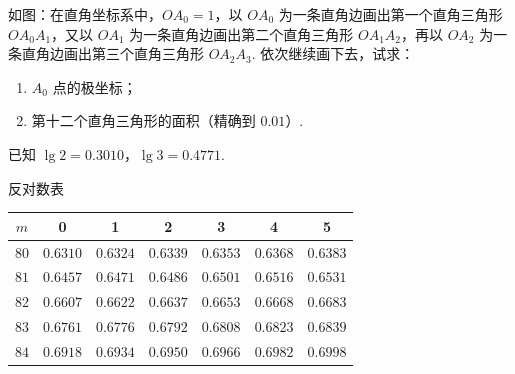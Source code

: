 \begin{problem}
如图：在直角坐标系中，\(OA_0=1\)，以 \(OA_0\) 为一条直角边画出第一个直角三角形 \(OA_0A_1\)，又以 \(OA_1\) 为一条直角边画出第二个直角三角形 \(OA_1A_2\)，再以 \(OA_2\) 为一条直角边画出第三个直角三角形 \(OA_2A_3\). 依次继续画下去，试求：

\begin{enumerate}
    \item \(A_0\) 点的极坐标；
    \item 第十二个直角三角形的面积（精确到 \(0.01\)）.
\end{enumerate}

已知 \(\lg 2=0.3010\)，\(\lg 3=0.4771\).

\begin{center}
反对数表

\begin{tabular}{c|cccccc}
\hline
\(m\) & 0 & 1 & 2 & 3 & 4 & 5 \\
\hline
\(80\) & \(0.6310\) & \(0.6324\) & \(0.6339\) & \(0.6353\) & \(0.6368\) & \(0.6383\) \\
\(81\) & \(0.6457\) & \(0.6471\) & \(0.6486\) & \(0.6501\) & \(0.6516\) & \(0.6531\) \\
\(82\) & \(0.6607\) & \(0.6622\) & \(0.6637\) & \(0.6653\) & \(0.6668\) & \(0.6683\) \\
\(83\) & \(0.6761\) & \(0.6776\) & \(0.6792\) & \(0.6808\) & \(0.6823\) & \(0.6839\) \\
\(84\) & \(0.6918\) & \(0.6934\) & \(0.6950\) & \(0.6966\) & \(0.6982\) & \(0.6998\) \\
\hline
\end{tabular}
\end{center}

\begin{center}
\end{center}
\end{problem}


